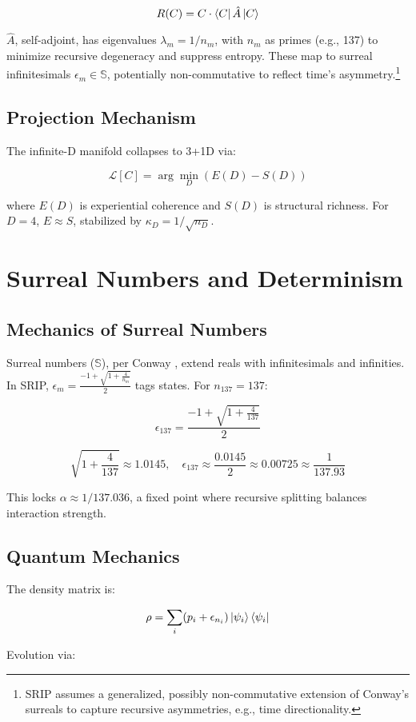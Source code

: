 \documentclass[12pt]{article}
\begin{document}
\[
R(C) = C \cdot \bra{C} \hat{A} \ket{C}
\]

\(\hat{A}\), self-adjoint, has eigenvalues \(\lambda_m = 1 / n_m\), with \(n_m\) as primes (e.g., 137) to minimize recursive degeneracy and suppress entropy. These map to surreal infinitesimals \(\epsilon_m \in \mathbb{S}\), potentially non-commutative to reflect time's asymmetry.\footnote{SRIP assumes a generalized, possibly non-commutative extension of Conway's surreals to capture recursive asymmetries, e.g., time directionality.}

\subsection{Projection Mechanism}
The infinite-D manifold collapses to 3+1D via:

\[
\mathcal{L}[C] = \arg\min_D (E(D) - S(D))
\]

where \(E(D)\) is experiential coherence and \(S(D)\) is structural richness. For \(D = 4\), \(E \approx S\), stabilized by \(\kappa_D = 1 / \sqrt{n_D}\).

\section{Surreal Numbers and Determinism}
\subsection{Mechanics of Surreal Numbers}
Surreal numbers (\(\mathbb{S}\)), per Conway \cite{Conway1976}, extend reals with infinitesimals and infinities. In SRIP, \(\epsilon_m = \frac{-1 + \sqrt{1 + \frac{4}{n_m}}}{2}\) tags states. For \(n_{137} = 137\):

\[
\epsilon_{137} = \frac{-1 + \sqrt{1 + \frac{4}{137}}}{2}
\]

\[
\sqrt{1 + \frac{4}{137}} \approx 1.0145, \quad \epsilon_{137} \approx \frac{0.0145}{2} \approx 0.00725 \approx \frac{1}{137.93}
\]

This locks \(\alpha \approx 1/137.036\), a fixed point where recursive splitting balances interaction strength.

\subsection{Quantum Mechanics}
The density matrix is:

\[
\rho = \sum_i (p_i + \epsilon_{n_i}) \ket{\psi_i}\bra{\psi_i}
\]

Evolution via:
\end{document}
